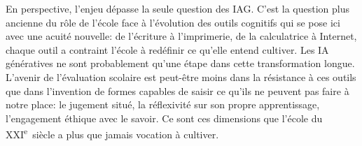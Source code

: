 En perspective, l'enjeu dépasse la seule question des IAG. 
C'est la question plus ancienne du rôle de l'école face à l'évolution des outils cognitifs qui se pose ici avec une acuité nouvelle: de l'écriture à l'imprimerie, de la calculatrice à Internet, chaque outil a contraint l'école à redéfinir ce qu'elle entend cultiver. 
Les IA génératives ne sont probablement qu'une étape dans cette transformation longue. 
L'avenir de l'évaluation scolaire est peut-être moins dans la résistance à ces outils que dans l'invention de formes capables de saisir ce qu'ils ne peuvent pas faire à notre place: le jugement situé, la réflexivité sur son propre apprentissage, l'engagement éthique avec le savoir. 
Ce sont ces dimensions que l'école du XXI\textsuperscript{e}~siècle a plus que jamais vocation à cultiver.